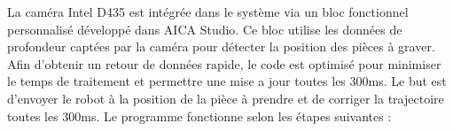 La caméra Intel D435 est intégrée dans le système via un bloc fonctionnel personnalisé développé dans AICA Studio. Ce bloc utilise les données de profondeur captées par la caméra pour détecter la position des pièces à graver.
Afin d'obtenir un retour de données rapide, le code est optimisé pour minimiser le temps de traitement et permettre une mise a jour toutes les 300ms. Le but est d'envoyer le robot à la position de la pièce à prendre et de corriger la trajectoire toutes les 300ms.
Le programme fonctionne selon les étapes suivantes :
\begin{figure}[H]
    \centering
    \begin{minipage}{0.55\textwidth}
        \centering
        \begin{tikzpicture}[node distance=1.8cm, every node/.style={draw, align=center, rounded corners, minimum height=1cm}]


\end{tikzpicture}
\end{minipage}
\end{figure}
